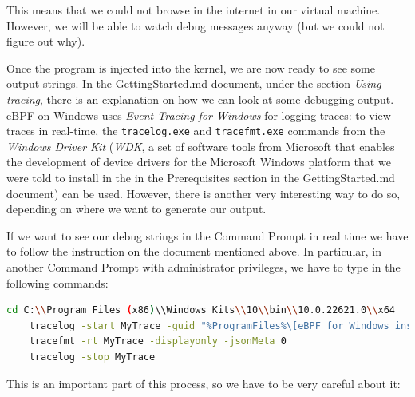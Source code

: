 This means that we could not browse in the internet in our virtual machine.
However, we will be able to watch debug messages anyway (but we could not figure out why).

Once the program is injected into the kernel, we are now ready to see some output strings.
In the GettingStarted.md document, under the section \textit{Using tracing}, there is an explanation on how we can look at some debugging output.
eBPF on Windows uses \textit{Event Tracing for Windows} for logging traces: to view traces in real-time, the  \colorbox{backcolour}{\lstinline[style=commandline, language=bash, breaklines=true]|tracelog.exe|} and \colorbox{backcolour}{\lstinline[style=commandline, language=bash, breaklines=true]|tracefmt.exe|} commands from the \textit{Windows Driver Kit} (\textit{WDK}, a set of software tools from Microsoft that enables the development of device drivers for the Microsoft Windows platform that we were told to install in the in the Prerequisites section in the GettingStarted.md document) can be used.  
However, there is another very interesting way to do so, depending on where we want to generate our output.

If we want to see our debug strings in the Command Prompt in real time we have to follow the instruction on the document mentioned above.
In particular, in another Command Prompt with administrator privileges, we have to type in the following commands:

\begin{lstlisting}[style=commandline, language=bash, caption={Commands to start real-time debugging using \colorbox{backcolour}{\lstinline[style=commandline, language=bash]|tracelog|} and \colorbox{backcolour}{\lstinline[style=commandline, language=bash]|tracefmt|}.}]
	cd C:\\Program Files (x86)\\Windows Kits\\10\\bin\\10.0.22621.0\\x64
	tracelog -start MyTrace -guid "%ProgramFiles%\[eBPF for Windows install folder]\ebpf-printk.guid" -rt 
	tracefmt -rt MyTrace -displayonly -jsonMeta 0
	tracelog -stop MyTrace
\end{lstlisting}

This is an important part of this process, so we have to be very careful about it:

